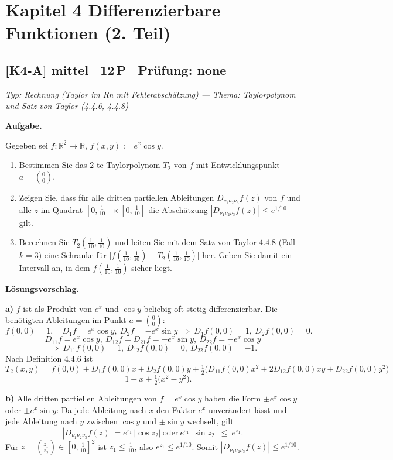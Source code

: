 \documentclass[a4paper,11pt]{article}
\begin{document}
\section*{Kapitel 4 \quad Differenzierbare Funktionen (2. Teil)}
\subsection*{[K4-A] \normalfont mittel \textbullet\ 12\,P \textbullet\ Pr\"ufung: none}
\textit{Typ: Rechnung (Taylor im Rn mit Fehlerabschätzung)  ---  Thema: Taylorpolynom und Satz von Taylor (4.4.6, 4.4.8)}\par\smallskip
\textbf{Aufgabe.}\par
Gegeben sei $f:\mathbb{R}^2\to\mathbb{R}$, $f(x,y):=e^{x}\cos y$.
\begin{enumerate}[label=\alph*)]
  \item Bestimmen Sie das $2$-te Taylorpolynom $T_2$ von $f$ mit Entwicklungspunkt $a=\binom{0}{0}$.
  \item Zeigen Sie, dass für alle dritten partiellen Ableitungen $D_{\nu_1\nu_2\nu_3}f(z)$ von $f$ und alle $z$ im Quadrat $[0,\tfrac{1}{10}]\times[0,\tfrac{1}{10}]$ die Abschätzung $|D_{\nu_1\nu_2\nu_3}f(z)|\le e^{1/10}$ gilt.
  \item Berechnen Sie $T_2\!\left(\tfrac{1}{10},\tfrac{1}{10}\right)$ und leiten Sie mit dem Satz von Taylor $4.4.8$ (Fall $k=3$) eine Schranke für $\bigl|f(\tfrac{1}{10},\tfrac{1}{10})-T_2(\tfrac{1}{10},\tfrac{1}{10})\bigr|$ her. Geben Sie damit ein Intervall an, in dem $f(\tfrac{1}{10},\tfrac{1}{10})$ sicher liegt.
\end{enumerate}\par\smallskip
\textbf{L\"osungsvorschlag.}\par
\textbf{a)} $f$ ist als Produkt von $e^x$ und $\cos y$ beliebig oft stetig differenzierbar. Die benötigten Ableitungen im Punkt $a=\binom{0}{0}$:
\[ f(0,0)=1,\quad D_1f=e^x\cos y,\ D_2f=-e^x\sin y \ \Rightarrow\ D_1f(0,0)=1,\ D_2f(0,0)=0. \]
\[ D_{11}f=e^x\cos y,\ D_{12}f=D_{21}f=-e^x\sin y,\ D_{22}f=-e^x\cos y \]
\[ \Rightarrow\ D_{11}f(0,0)=1,\ D_{12}f(0,0)=0,\ D_{22}f(0,0)=-1. \]
Nach Definition $4.4.6$ ist
\[ T_2(x,y)=f(0,0)+D_1f(0,0)x+D_2f(0,0)y+\tfrac{1}{2}\bigl(D_{11}f(0,0)x^2+2D_{12}f(0,0)xy+D_{22}f(0,0)y^2\bigr) \]
\[ = 1+x+\tfrac{1}{2}\bigl(x^2-y^2\bigr). \]

\textbf{b)} Alle dritten partiellen Ableitungen von $f=e^x\cos y$ haben die Form $\pm e^x\cos y$ oder $\pm e^x\sin y$: Da jede Ableitung nach $x$ den Faktor $e^x$ unverändert lässt und jede Ableitung nach $y$ zwischen $\cos y$ und $\pm\sin y$ wechselt, gilt
\[ |D_{\nu_1\nu_2\nu_3}f(z)| = e^{z_1}\,|{\cos z_2}| \ \text{oder}\ e^{z_1}\,|{\sin z_2}| \ \le\ e^{z_1}. \]
Für $z=\binom{z_1}{z_2}\in[0,\tfrac1{10}]^2$ ist $z_1\le\tfrac1{10}$, also $e^{z_1}\le e^{1/10}$. Somit $|D_{\nu_1\nu_2\nu_3}f(z)|\le e^{1/10}$.
\end{document}
